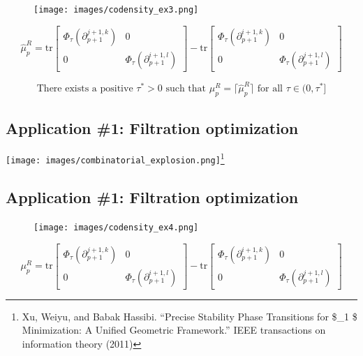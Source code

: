 \documentclass[
  letterpaper,
  DIV=11,
  numbers=noendperiod,
  oneside]{scrartcl}
\begin{document}
\begin{figure}

{\centering \texttt{[image: images/codensity\_ex3.png]}

}

\end{figure}

\[ 
\hat{\mu}_p^{R} = 
\mathrm{tr}\begin{bmatrix} \Phi_\tau(\partial_{p+1}^{j + 1, k}) & 0 \\
0 & \Phi_\tau(\partial_{p+1}^{i + 1, l})
\end{bmatrix}
- 
\mathrm{tr}\begin{bmatrix} \Phi_\tau(\partial_{p+1}^{i + 1, k}) & 0 \\
0 & \Phi_\tau(\partial_{p+1}^{j + 1, l})
\end{bmatrix}
\]

\[\boxed{\text{There exists a positive }\tau^\ast > 0 \text{ such that } \mu_p^R = \lceil \hat{\mu}_p^R \rceil \text{ for all } \tau \in (0, \tau^\ast]}\]

\subsection{Application \#1: Filtration
optimization}\label{application-1-filtration-optimization-5}

\texttt{[image: images/combinatorial\_explosion.png]}\footnote{Xu, Weiyu,
  and Babak Hassibi. ``Precise Stability Phase Transitions for \$\ell\_1
  \$ Minimization: A Unified Geometric Framework.'' IEEE transactions on
  information theory (2011)}

\subsection{Application \#1: Filtration
optimization}\label{application-1-filtration-optimization-6}

\begin{figure}

{\centering \texttt{[image: images/codensity\_ex4.png]}

}

\end{figure}

\[ \mu_p^{R} = \mathrm{tr}\begin{bmatrix} \Phi_\tau(\partial_{p+1}^{j + 1, k}) & 0 \\
0 & \Phi_\tau(\partial_{p+1}^{i + 1, l})
\end{bmatrix}
- 
\mathrm{tr}\begin{bmatrix} \Phi_\tau(\partial_{p+1}^{i + 1, k}) & 0 \\
0 & \Phi_\tau(\partial_{p+1}^{j + 1, l})
\end{bmatrix}
\]
\end{document}
